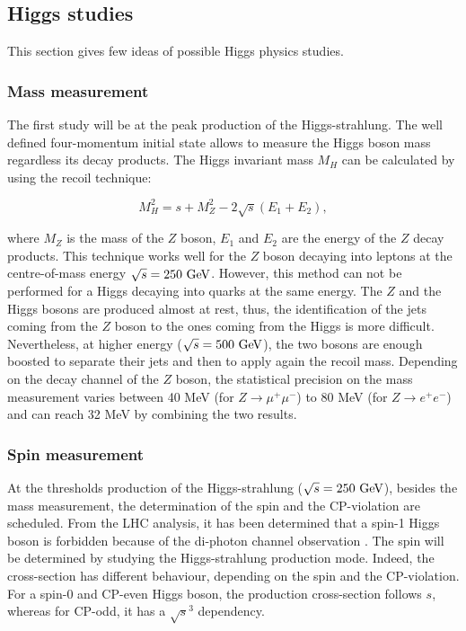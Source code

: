    \subsection{Higgs studies}

    This section gives few ideas of possible Higgs physics studies.

    \subsubsection{Mass measurement}

    The first study will be at the peak production of the Higgs-strahlung. 
    The well defined four-momentum initial state allows to measure the Higgs boson mass regardless its decay products.
    The Higgs invariant mass $M_H$ can be calculated by using the recoil technique:

    \begin{equation}
      M^2_H = s + M^2_Z - 2 \sqrt{s}\left(E_{1} + E_{2}\right),
    \end{equation}

    where $M_Z$ is the mass of the $Z$ boson, $E_1$ and $E_2$ are the energy of the $Z$ decay products. 
    This technique works well for the $Z$ boson decaying into leptons at the centre-of-mass energy $\sqrt{s} = 250~\rm{GeV}$.
    However, this method can not be performed for a Higgs decaying into quarks at the same energy. 
    The $Z$ and the Higgs bosons are produced almost at rest, thus, the identification of the jets coming from the $Z$ boson to the ones coming from the Higgs is more difficult.
    Nevertheless, at higher energy ($\sqrt{s} = 500~\rm{GeV}$), the two bosons are enough boosted to separate their jets and then to apply again the recoil mass.
    Depending on the decay channel of the $Z$ boson, the statistical precision on the mass measurement varies between 40 MeV (for $Z \rightarrow \mu^+\mu^-$) to 80 MeV (for $Z \rightarrow e^+e^-$) and can reach 32 MeV by combining the two results.

    \subsubsection{Spin measurement}

    At the thresholds production of the Higgs-strahlung ($\sqrt{s} = 250~\rm{GeV}$), besides the mass measurement, the determination of the spin and the CP-violation are scheduled.
    From the \gls{LHC} analysis, it has been determined that a spin-1 Higgs boson is forbidden because of the di-photon channel observation \cite{TheATLASCollaboration2013}.
    The spin will be determined by studying the Higgs-strahlung production mode.
    Indeed, the cross-section has different behaviour, depending on the spin and the CP-violation.
    For a spin-0 and CP-even Higgs boson, the production cross-section follows $s$, whereas for CP-odd, it has a $\sqrt{s}^3$ dependency.

